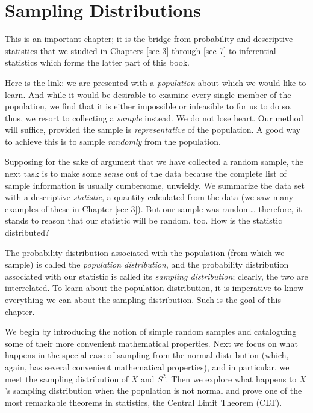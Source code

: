 \chapter{Sampling Distributions}
\label{sec-8}

\noindent
This is an important chapter; it is the bridge from probability and
descriptive statistics that we studied in Chapters
\ref{sec-3} through
\ref{sec-7} to inferential statistics which
forms the latter part of this book.

Here is the link: we are presented with a \emph{population} about which we
would like to learn. And while it would be desirable to examine every
single member of the population, we find that it is either impossible
or infeasible to for us to do so, thus, we resort to collecting a
\emph{sample} instead. We do not lose heart. Our method will suffice,
provided the sample is \emph{representative} of the population. A good way
to achieve this is to sample \emph{randomly} from the population.

Supposing for the sake of argument that we have collected a random
sample, the next task is to make some \emph{sense} out of the data because
the complete list of sample information is usually cumbersome,
unwieldy. We summarize the data set with a descriptive \emph{statistic}, a
quantity calculated from the data (we saw many examples of these in
Chapter \ref{sec-3}). But our sample was
random\ldots{} therefore, it stands to reason that our statistic will be
random, too. How is the statistic distributed?

The probability distribution associated with the population (from
which we sample) is called the \emph{population distribution}, and the
probability distribution associated with our statistic is called its
\emph{sampling distribution}; clearly, the two are interrelated. To learn
about the population distribution, it is imperative to know everything
we can about the sampling distribution. Such is the goal of this
chapter.

We begin by introducing the notion of simple random samples and
cataloguing some of their more convenient mathematical
properties. Next we focus on what happens in the special case of
sampling from the normal distribution (which, again, has several
convenient mathematical properties), and in particular, we meet the
sampling distribution of \(\overline{X}\) and \(S^{2}\). Then we
explore what happens to \(\overline{X}\)'s sampling distribution when
the population is not normal and prove one of the most remarkable
theorems in statistics, the Central Limit Theorem (CLT).

